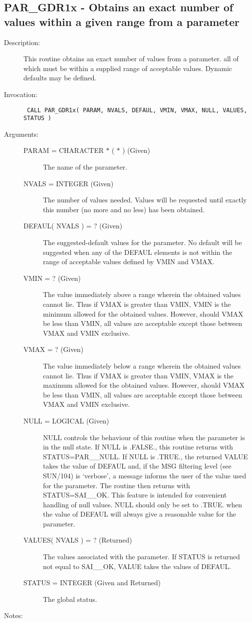 \documentclass[twoside,11pt]{article}
\newcommand{\xref}[3]{#1}
\newcommand{\xlabel}[1]{}
\newcommand{\latex}[1]{#1}
\newlength{\sstbannerlength}
\newlength{\sstcaptionlength}
\newlength{\sstexampleslength}
\newlength{\sstexampleswidth}
\newcommand{\sstroutine}[3]{
   \goodbreak
   \rule{\textwidth}{0.5mm}
   \vspace{-7ex}
   \newline
   \settowidth{\sstbannerlength}{{\Large {\bf #1}}}
   \setlength{\sstcaptionlength}{\textwidth}
   \setlength{\sstexampleslength}{\textwidth}
   \addtolength{\sstbannerlength}{0.5em}
   \addtolength{\sstcaptionlength}{-2.0\sstbannerlength}
   \addtolength{\sstcaptionlength}{-5.0pt}
   \settowidth{\sstexampleswidth}{{\bf Examples:}}
   \addtolength{\sstexampleslength}{-\sstexampleswidth}
   \parbox[t]{\sstbannerlength}{\flushleft{\Large {\bf #1}}}
   \parbox[t]{\sstcaptionlength}{\center{\Large #2}}
   \parbox[t]{\sstbannerlength}{\flushright{\Large {\bf #1}}}
   \begin{description}
      #3
   \end{description}
}
\newcommand{\sstdescription}[1]{\item[Description:] #1}
\newcommand{\sstinvocation}[1]{\item[Invocation:]\hspace{0.4em}{\tt #1}}
\newcommand{\sstarguments}[1]{
   \item[Arguments:] \mbox{} \\
   \vspace{-3.5ex}
   \begin{description}
      #1
   \end{description}
}
\newcommand{\sstsubsection}[1]{ \item[{#1}] \mbox{} \\}
\newcommand{\sstnotes}[1]{\item[Notes:] \mbox{} \\[1.3ex] #1}
\newcommand{\sstitemlist}[1]{
  \mbox{} \\
  \vspace{-7ex}
  \begin{itemize}
     #1
  \end{itemize}
}
\newcommand{\ssttt}{\tt}
\renewcommand{\sstroutine}[3]{
      \subsection{\xlabel{12}#1\xlabel{#1}-\label{#1}#2}
      \begin{description}
         #3
      \end{description}
   }
\renewcommand{\sstdescription}[1]{\item[Description:]
      \begin{description}
         #1
      \end{description}
   }
\renewcommand{\sstinvocation}[1]{\item[Invocation:]
      \begin{description}
         {\ssttt #1}
      \end{description}
   }
\renewcommand{\sstarguments}[1]{
      \item[Arguments:]
      \begin{description}
         #1
      \end{description}
   }
\renewcommand{\sstsubsection}[1]{\item[{#1}]}
\renewcommand{\sstnotes}[1]{\item[Notes:]
      \begin{description}
         #1
      \end{description}
   }
\newcommand{\sstitemlist}[1]{
      \begin{itemize}
         #1
      \end{itemize}
   }
\begin{document}
\sstroutine{
   PAR\_GDR1x
}{
   Obtains an exact number of values within a given range from a
   parameter
}{
   \sstdescription{
      This routine obtains an exact number of values from a parameter.
      all of which must be within a supplied range of acceptable
      values.  Dynamic defaults may be defined.
   }
   \sstinvocation{
      CALL PAR\_GDR1x( PARAM, NVALS, DEFAUL, VMIN, VMAX, NULL, VALUES,
                      STATUS )
   }
   \sstarguments{
      \sstsubsection{
         PARAM = CHARACTER $*$ ( $*$ ) (Given)
      }{
         The name of the parameter.
      }
      \sstsubsection{
         NVALS = INTEGER (Given)
      }{
         The number of values needed.  Values will be requested until
         exactly this number (no more and no less) has been obtained.
      }
      \sstsubsection{
         DEFAUL( NVALS ) = ? (Given)
      }{
         The suggested-default values for the parameter.  No default
         will be suggested when any of the DEFAUL elements is not
         within the range of acceptable values defined by VMIN and
         VMAX.
      }
      \sstsubsection{
         VMIN = ? (Given)
      }{
         The value immediately above a range wherein the obtained
         values cannot lie.  Thus if VMAX is greater than VMIN, VMIN
         is the minimum allowed for the obtained values.  However,
         should VMAX be less than VMIN, all values are acceptable
         except those between VMAX and VMIN exclusive.
      }
      \sstsubsection{
         VMAX = ? (Given)
      }{
         The value immediately below a range wherein the obtained
         values cannot lie.  Thus if VMAX is greater than VMIN, VMAX
         is the maximum allowed for the obtained values.  However,
         should VMAX be less than VMIN, all values are acceptable
         except those between VMAX and VMIN exclusive.
      }
      \sstsubsection{
         NULL = LOGICAL (Given)
      }{
         NULL controls the behaviour of this routine when the parameter
         is in the null state.  If NULL is .FALSE., this routine
         returns with STATUS=PAR\_\_NULL.  If NULL is .TRUE., the
         returned VALUE takes the value of DEFAUL and, if the
\xref{MSG filtering level}{sun104}{conditional_message_reporting}
\latex{ (see SUN/104)} is `verbose',
         a message informs the user of the value used for
         the parameter. The routine then returns with STATUS=SAI\_\_OK. 
         This feature is intended for convenient handling of null values.
         NULL should only be set to .TRUE. when the value of DEFAUL will
         always give a reasonable value for the parameter.
      }
      \sstsubsection{
         VALUES( NVALS ) = ? (Returned)
      }{
         The values associated with the parameter.  If STATUS is
         returned not equal to SAI\_\_OK, VALUE takes the values of
         DEFAUL.
      }
      \sstsubsection{
         STATUS = INTEGER (Given and Returned)
      }{
         The global status.
      }
   }
   \sstnotes{
      \sstitemlist{

}}}
\end{document}
